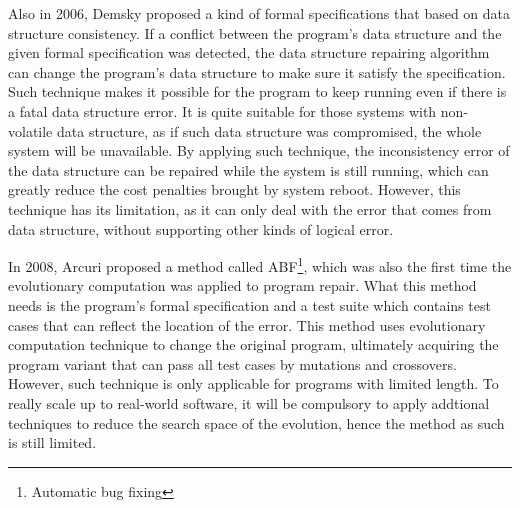 \documentclass[10pt,journal,final,]{article}
\theoremstyle{definition}
\begin{document}
Also in 2006, Demsky proposed a kind of formal specifications that based on data structure consistency\cite{IaEoDSCS}.
If a conflict between the program's data structure and the given formal specification was detected, the data structure repairing algorithm can change the program's data structure to make sure it satisfy the specification.
Such technique makes it possible for the program to keep running even if there is a fatal data structure error.
It is quite suitable for those systems with non-volatile data structure, as if such data structure was compromised, the whole system will be unavailable.
By applying such technique, the inconsistency error of the data structure can be repaired while the system is still running, which can greatly reduce the cost penalties brought by system reboot.
However, this technique has its limitation, as it can only deal with the error that comes from data structure, without supporting other kinds of logical error.

In 2008, Arcuri proposed a method called ABF\footnote{Automatic bug fixing}, which was also the first time the evolutionary computation was applied to program repair\cite{ANCEAtASBF}.
What this method needs is the program's formal specification and a test suite which contains test cases that can reflect the location of the error.
This method uses evolutionary computation technique to change the original program, ultimately acquiring the program variant that can pass all test cases by mutations and crossovers.
However, such technique is only applicable for programs with limited length. To really scale up to real-world software, it will be compulsory to apply addtional techniques to reduce the search space of the evolution, hence the method as such is still limited.
\end{document}
